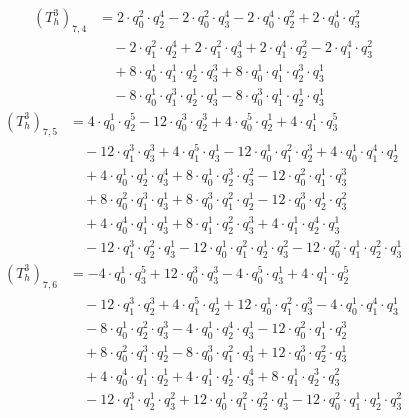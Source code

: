 \begin{align*}(T_{h}^3)_{7,4}&=2\cdot q_0^{2}\cdot q_2^{4}-2\cdot q_0^{2}\cdot q_3^{4}-2\cdot q_0^{4}\cdot q_2^{2}+2\cdot q_0^{4}\cdot q_3^{2}\\
&\quad -2\cdot q_1^{2}\cdot q_2^{4}+2\cdot q_1^{2}\cdot q_3^{4}+2\cdot q_1^{4}\cdot q_2^{2}-2\cdot q_1^{4}\cdot q_3^{2}\\
&\quad +8\cdot q_0^{1}\cdot q_1^{1}\cdot q_2^{1}\cdot q_3^{3}+8\cdot q_0^{1}\cdot q_1^{1}\cdot q_2^{3}\cdot q_3^{1}\\
&\quad -8\cdot q_0^{1}\cdot q_1^{3}\cdot q_2^{1}\cdot q_3^{1}-8\cdot q_0^{3}\cdot q_1^{1}\cdot q_2^{1}\cdot q_3^{1}\end{align*}
\begin{align*}(T_{h}^3)_{7,5}&=4\cdot q_0^{1}\cdot q_2^{5}-12\cdot q_0^{3}\cdot q_2^{3}+4\cdot q_0^{5}\cdot q_2^{1}+4\cdot q_1^{1}\cdot q_3^{5}\\
&\quad -12\cdot q_1^{3}\cdot q_3^{3}+4\cdot q_1^{5}\cdot q_3^{1}-12\cdot q_0^{1}\cdot q_1^{2}\cdot q_2^{3}+4\cdot q_0^{1}\cdot q_1^{4}\cdot q_2^{1}\\
&\quad +4\cdot q_0^{1}\cdot q_2^{1}\cdot q_3^{4}+8\cdot q_0^{1}\cdot q_2^{3}\cdot q_3^{2}-12\cdot q_0^{2}\cdot q_1^{1}\cdot q_3^{3}\\
&\quad +8\cdot q_0^{2}\cdot q_1^{3}\cdot q_3^{1}+8\cdot q_0^{3}\cdot q_1^{2}\cdot q_2^{1}-12\cdot q_0^{3}\cdot q_2^{1}\cdot q_3^{2}\\
&\quad +4\cdot q_0^{4}\cdot q_1^{1}\cdot q_3^{1}+8\cdot q_1^{1}\cdot q_2^{2}\cdot q_3^{3}+4\cdot q_1^{1}\cdot q_2^{4}\cdot q_3^{1}\\
&\quad -12\cdot q_1^{3}\cdot q_2^{2}\cdot q_3^{1}-12\cdot q_0^{1}\cdot q_1^{2}\cdot q_2^{1}\cdot q_3^{2}-12\cdot q_0^{2}\cdot q_1^{1}\cdot q_2^{2}\cdot q_3^{1}\end{align*}
\begin{align*}(T_{h}^3)_{7,6}&=-4\cdot q_0^{1}\cdot q_3^{5}+12\cdot q_0^{3}\cdot q_3^{3}-4\cdot q_0^{5}\cdot q_3^{1}+4\cdot q_1^{1}\cdot q_2^{5}\\
&\quad -12\cdot q_1^{3}\cdot q_2^{3}+4\cdot q_1^{5}\cdot q_2^{1}+12\cdot q_0^{1}\cdot q_1^{2}\cdot q_3^{3}-4\cdot q_0^{1}\cdot q_1^{4}\cdot q_3^{1}\\
&\quad -8\cdot q_0^{1}\cdot q_2^{2}\cdot q_3^{3}-4\cdot q_0^{1}\cdot q_2^{4}\cdot q_3^{1}-12\cdot q_0^{2}\cdot q_1^{1}\cdot q_2^{3}\\
&\quad +8\cdot q_0^{2}\cdot q_1^{3}\cdot q_2^{1}-8\cdot q_0^{3}\cdot q_1^{2}\cdot q_3^{1}+12\cdot q_0^{3}\cdot q_2^{2}\cdot q_3^{1}\\
&\quad +4\cdot q_0^{4}\cdot q_1^{1}\cdot q_2^{1}+4\cdot q_1^{1}\cdot q_2^{1}\cdot q_3^{4}+8\cdot q_1^{1}\cdot q_2^{3}\cdot q_3^{2}\\
&\quad -12\cdot q_1^{3}\cdot q_2^{1}\cdot q_3^{2}+12\cdot q_0^{1}\cdot q_1^{2}\cdot q_2^{2}\cdot q_3^{1}-12\cdot q_0^{2}\cdot q_1^{1}\cdot q_2^{1}\cdot q_3^{2}\end{align*}
